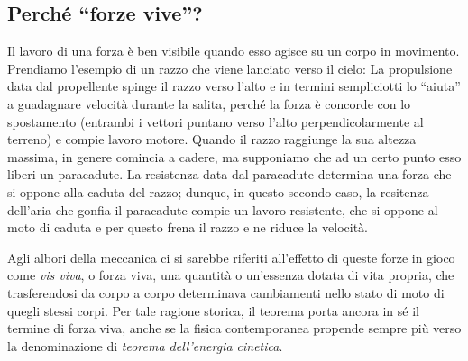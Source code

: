 \subsection{Perché ``forze vive''?}
Il lavoro di una forza è ben visibile quando esso agisce su un corpo
in movimento. Prendiamo l'esempio di un razzo che viene lanciato verso
il cielo: La propulsione data dal
propellente spinge il razzo verso l'alto e in termini sempliciotti lo
``aiuta'' a guadagnare velocità durante la salita, perché la forza è
concorde con lo spostamento (entrambi i vettori puntano verso l'alto
perpendicolarmente al terreno) e compie lavoro motore. Quando il razzo raggiunge la sua altezza
massima, in genere comincia a cadere, ma supponiamo che ad un certo
punto esso liberi un paracadute. La resistenza data dal paracadute
determina una forza che si oppone alla caduta del razzo; dunque, in
questo secondo caso, la resitenza dell'aria che gonfia il paracadute
compie un lavoro resistente, che si oppone al moto di caduta e per questo
frena il razzo e ne riduce la velocità.

Agli albori della meccanica ci si sarebbe riferiti all'effetto di queste
forze in gioco come \textit{vis viva}, o forza viva, una quantità o
un'essenza dotata di vita propria,
che trasferendosi da corpo a corpo determinava cambiamenti nello stato
di moto di quegli stessi corpi. Per tale ragione storica, il teorema
porta ancora in sé il termine di forza viva, anche se la fisica
contemporanea propende sempre più verso la denominazione di
\textit{teorema dell'energia cinetica}.